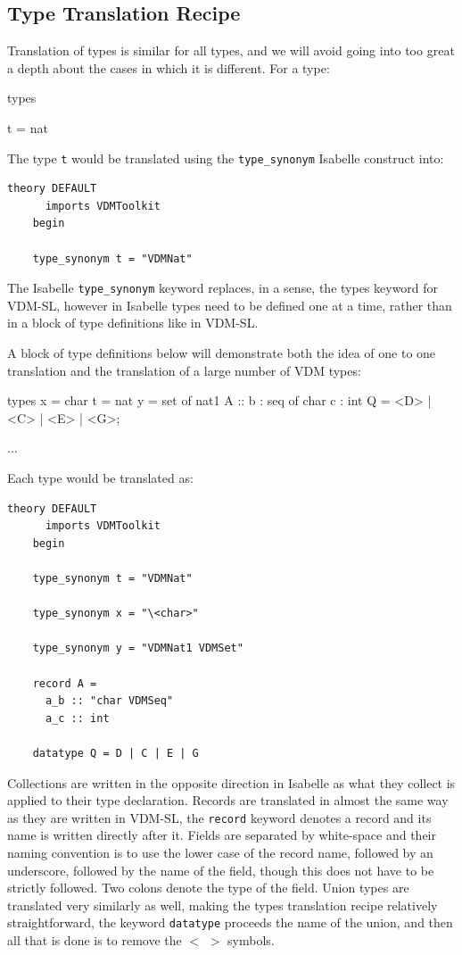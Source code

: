 	\subsection{Type Translation Recipe}
	Translation of types is similar for all types, and we will avoid going into too great a depth about the cases in which it is different. For a type:
	\begin{vdmsl}
	types

	t = nat
	\end{vdmsl} 

	The type \lstinline[language=Isabelle, mathescape]{t} would be translated using the \lstinline[language=Isabelle, mathescape]{type_synonym} Isabelle construct into:

	\begin{lstlisting}[language=Isabelle, mathescape]
	theory DEFAULT
	  imports VDMToolkit
	begin

	type_synonym t = "VDMNat"

	\end{lstlisting}

	The Isabelle \lstinline[language=Isabelle, mathescape]{type_synonym} keyword replaces, in a sense, the types keyword for VDM-SL, however in Isabelle types need to be defined one at a time, rather than in a block of type definitions like in VDM-SL.

	A block of type definitions below will demonstrate both the idea of one to one translation and the translation of a large number of VDM types:
	\begin{vdmsl}
	types
	x = char
	t = nat
	y = set of nat1
	A :: b : seq of char
         c : int
    Q = <D> | <C> | <E> | <G>;

	...
	\end{vdmsl}
	Each type would be translated as:
	\begin{lstlisting}[language=Isabelle, mathescape]
	theory DEFAULT
	  imports VDMToolkit
	begin

	type_synonym t = "VDMNat"

	type_synonym x = "\<char>"

	type_synonym y = "VDMNat1 VDMSet"

	record A =
	  a_b :: "char VDMSeq"  
	  a_c :: int

	datatype Q = D | C | E | G
	\end{lstlisting}
	Collections are written in the opposite direction in Isabelle as what they collect is applied to their type declaration. Records are translated in almost the same way as they are written in VDM-SL, the \lstinline[language=Isabelle, mathescape]{record} keyword denotes a record and its name is written directly after it. Fields are separated by white-space and their naming convention is to use the lower case of the record name, followed by an underscore, followed by the name of the field, though this does not have to be strictly followed. Two colons denote the type of the field. Union types are translated very similarly as well, making the types translation recipe relatively straightforward, the keyword \lstinline[language=Isabelle, mathescape]{datatype} proceeds the name of the union, and then all that is done is to remove the $<$  $>$ symbols.

